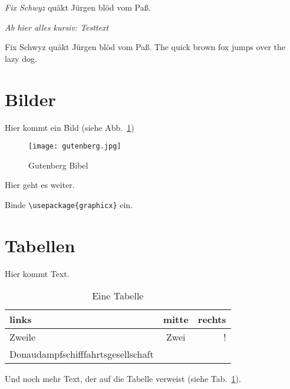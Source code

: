 \documentclass[a4paper]{article}
\begin{document}
\textit{Fix Schwyz} quäkt Jürgen blöd vom Paß.

\itshape
Ab hier alles kursiv: Testtext

Fix Schwyz quäkt Jürgen blöd vom Paß.
The quick brown fox jumps over the lazy dog.
\upshape

\section{Bilder}

Hier kommt ein Bild (siehe Abb.~\ref{im:Bibel})

\begin{figure}
\begin{center}
    \texttt{[image: gutenberg.jpg]}
\caption{Gutenberg Bibel}
\label{im:Bibel}
\end{center}
\end{figure}

Hier geht es weiter.
\listoffigures

Binde \verb+\usepackage{graphicx}+ ein.

\section{Tabellen}
Hier kommt Text.
\begin{table}[tbp]
\begin{center}
\begin{tabular}{|p{2cm}|c r|}
\hline
links    &    mitte    &    rechts\\
\hline
Zweile   &    Zwei     &    !\\
Donau\-dampf\-schiff\-fahrts\-ge\-sell\-schaft&&\\
\hline
\hline
\end{tabular}
\caption{Eine Tabelle}
\label{tab:Tabelle}
\end{center}
\end{table}
Und noch mehr Text, der auf die Tabelle verweist (siehe Tab.~\ref{tab:Tabelle}).
\listoftables
\end{document}
